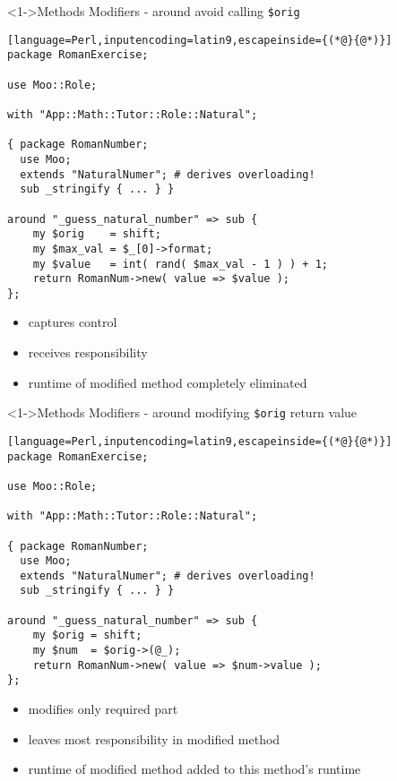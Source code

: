 \documentclass[ngerman,xcolor={table,dvipsnames},scriptsizeer,compress,hyperref={bookmarks,colorlinks}]{beamer}
\begin{document}
\begin{frame}[fragile]

\begin{block}<1->{Methods Modifiers - around avoid calling \texttt{\$orig}}
\scriptsize
\begin{lstlisting}[language=Perl,inputencoding=latin9,escapeinside={(*@}{@*)}]
package RomanExercise;

use Moo::Role;

with "App::Math::Tutor::Role::Natural";

{ package RomanNumber;
  use Moo;
  extends "NaturalNumer"; # derives overloading!
  sub _stringify { ... } }

around "_guess_natural_number" => sub {
    my $orig    = shift;
    my $max_val = $_[0]->format;
    my $value   = int( rand( $max_val - 1 ) ) + 1;
    return RomanNum->new( value => $value );
};
\end{lstlisting}
\end{block}

\begin{itemize}
\item captures control
\item receives responsibility
\item runtime of modified method completely eliminated
\end{itemize}

\end{frame}

\begin{frame}[fragile]

\begin{block}<1->{Methods Modifiers - around modifying \texttt{\$orig} return value}
\scriptsize
\begin{lstlisting}[language=Perl,inputencoding=latin9,escapeinside={(*@}{@*)}]
package RomanExercise;

use Moo::Role;

with "App::Math::Tutor::Role::Natural";

{ package RomanNumber;
  use Moo;
  extends "NaturalNumer"; # derives overloading!
  sub _stringify { ... } }

around "_guess_natural_number" => sub {
    my $orig = shift;
    my $num  = $orig->(@_);
    return RomanNum->new( value => $num->value );
};
\end{lstlisting}
\end{block}

\begin{itemize}
\item modifies only required part
\item leaves most responsibility in modified method
\item runtime of modified method added to this method's runtime
\end{itemize}

\end{frame}
\end{document}
